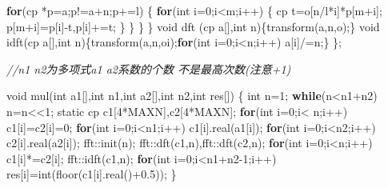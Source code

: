 \documentclass[
]{article}
\newenvironment{Shaded}{}{}
\newcommand{\AttributeTok}[1]{\textcolor[rgb]{0.49,0.56,0.16}{#1}}
\newcommand{\CommentTok}[1]{\textcolor[rgb]{0.38,0.63,0.69}{\textit{#1}}}
\newcommand{\ControlFlowTok}[1]{\textcolor[rgb]{0.00,0.44,0.13}{\textbf{#1}}}
\newcommand{\DataTypeTok}[1]{\textcolor[rgb]{0.56,0.13,0.00}{#1}}
\newcommand{\DecValTok}[1]{\textcolor[rgb]{0.25,0.63,0.44}{#1}}
\newcommand{\FloatTok}[1]{\textcolor[rgb]{0.25,0.63,0.44}{#1}}
\newcommand{\NormalTok}[1]{#1}
\begin{document}
\begin{Shaded}
\begin{Highlighting}[]
            \ControlFlowTok{for}\NormalTok{(cp *p=a;p!=a+n;p+=l)}
\NormalTok{            \{}
                \ControlFlowTok{for}\NormalTok{(}\DataTypeTok{int}\NormalTok{ i=}\DecValTok{0}\NormalTok{;i\textless{}m;i++)}
\NormalTok{                \{}
\NormalTok{                    cp t=o[n/l*i]*p[m+i];}
\NormalTok{                    p[m+i]=p[i]{-}t,p[i]+=t;}
\NormalTok{                \}}
\NormalTok{            \}}
\NormalTok{        \}}
\NormalTok{    \}}
    \DataTypeTok{void}\NormalTok{ dft (cp a[],}\DataTypeTok{int}\NormalTok{ n)\{transform(a,n,o);\}}
    \DataTypeTok{void}\NormalTok{ idft(cp a[],}\DataTypeTok{int}\NormalTok{ n)\{transform(a,n,oi);}\ControlFlowTok{for}\NormalTok{(}\DataTypeTok{int}\NormalTok{ i=}\DecValTok{0}\NormalTok{;i\textless{}n;i++) a[i]/=n;\}}
\NormalTok{\};}

\CommentTok{//n1 n2为多项式a1 a2系数的个数 不是最高次数(注意+1)}

\DataTypeTok{void}\NormalTok{ mul(}\DataTypeTok{int}\NormalTok{ a1[],}\DataTypeTok{int}\NormalTok{ n1,}\DataTypeTok{int}\NormalTok{ a2[],}\DataTypeTok{int}\NormalTok{ n2,}\DataTypeTok{int}\NormalTok{ res[])}
\NormalTok{\{}
    \DataTypeTok{int}\NormalTok{ n=}\DecValTok{1}\NormalTok{;}
    \ControlFlowTok{while}\NormalTok{(n\textless{}n1+n2) n=n\textless{}\textless{}}\DecValTok{1}\NormalTok{;}
    \AttributeTok{static}\NormalTok{ cp c1[}\DecValTok{4}\NormalTok{*MAXN],c2[}\DecValTok{4}\NormalTok{*MAXN];}
    \ControlFlowTok{for}\NormalTok{(}\DataTypeTok{int}\NormalTok{ i=}\DecValTok{0}\NormalTok{;i\textless{} n;i++) c1[i]=c2[i]=}\DecValTok{0}\NormalTok{;}
    \ControlFlowTok{for}\NormalTok{(}\DataTypeTok{int}\NormalTok{ i=}\DecValTok{0}\NormalTok{;i\textless{}n1;i++) c1[i].real(a1[i]);}
    \ControlFlowTok{for}\NormalTok{(}\DataTypeTok{int}\NormalTok{ i=}\DecValTok{0}\NormalTok{;i\textless{}n2;i++) c2[i].real(a2[i]);}
\NormalTok{    fft::init(n);}
\NormalTok{    fft::dft(c1,n),fft::dft(c2,n);}
    \ControlFlowTok{for}\NormalTok{(}\DataTypeTok{int}\NormalTok{ i=}\DecValTok{0}\NormalTok{;i\textless{}n;i++) c1[i]*=c2[i];}
\NormalTok{    fft::idft(c1,n);}
    \ControlFlowTok{for}\NormalTok{(}\DataTypeTok{int}\NormalTok{ i=}\DecValTok{0}\NormalTok{;i\textless{}n1+n2{-}}\DecValTok{1}\NormalTok{;i++)}
\NormalTok{        res[i]=}\DataTypeTok{int}\NormalTok{(floor(c1[i].real()+}\FloatTok{0.5}\NormalTok{));}
\NormalTok{\}}


\end{Highlighting}
\end{Shaded}
\end{document}
